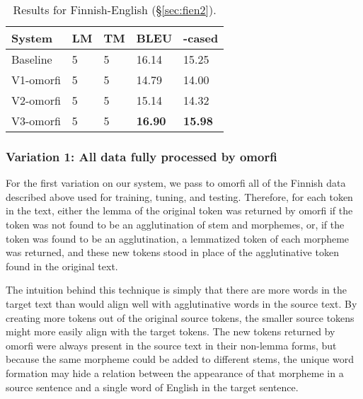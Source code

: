 




\begin{table}[!t]
\center 
{
	\begin{tabular}{|l|l|l|l|l|}
	\hline
	System                 & LM & TM &         BLEU   &         -cased          \\ \hline
    Baseline               & 5  & 5  &         16.14  &         15.25           \\ \hline
    V1-omorfi              & 5  & 5  &         14.79  &         14.00           \\ \hline
    V2-omorfi              & 5  & 5  &         15.14  &         14.32           \\ \hline
    V3-omorfi              & 5  & 5  & \textbf{16.90} & \textbf{15.98}          \\ \hline
	\end{tabular}
}
\caption{Results for Finnish-English (\S\ref{sec:fien2}).}
\label{tab:fien2}
\end{table}

\subsubsection{Variation 1: All data fully processed by omorfi}
\label{sec:fienv1}

For the first variation on our system, we pass to omorfi all of the Finnish data described above used for training, tuning, and testing.
%
Therefore, for each token in the text, either the lemma of the original token was returned by omorfi if the token was not found to be an agglutination of stem and morphemes, or, if the token was found to be an agglutination, a lemmatized token of each morpheme was returned, and these new tokens stood in place of the agglutinative token found in the original text.

The intuition behind this technique is simply that there are more words in the target text than would align well with agglutinative words in the source text.
%
By creating more tokens out of the original source tokens, the smaller source tokens might more easily align with the target tokens.
%
The new tokens returned by omorfi were always present in the source text in their non-lemma forms, but because the same morpheme could be added to different stems, the unique word formation may hide a relation between the appearance of that morpheme in a source sentence and a single word of English in the target sentence.

